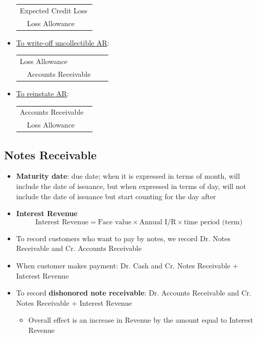 \documentclass{article}
\begin{document}
\begin{multicols}{2}
\begin{itemize}
	\begin{tabular}{llll}
		\multicolumn{4}{l}{Expected Credit Loss}\\
		& Loss Allowance& &
	\end{tabular}\vspace{0.5em}
    \item \underline{To write-off uncollectible AR}:\vspace{0.5em}\\
\begin{tabular}{llll}
	\multicolumn{4}{l}{Loss Allowance}\\
	& Accounts Receivable& &
\end{tabular}\vspace{0.5em}
    \item \underline{To reinstate AR}:\vspace{0.5em}\\
    \begin{tabular}{llll}
    	\multicolumn{4}{l}{Accounts Receivable}\\
    	& Loss Allowance& &
    \end{tabular}\vspace{0.5em}
\end{itemize}


\subsection{Notes Receivable}
\begin{itemize}
	\item \textbf{Maturity date}: due date; when it is expressed in terms of month, will include the date of issuance, but when expressed in terms of day, will not include the date of issuance but start counting for the day after
	\item \textbf{Interest Revenue}
	$$\text{Interest Revenue} = \text{Face value} \times \text{Annual I/R} \times \text{time period (term)}$$
	\item To record customers who want to pay by notes, we record Dr. Notes Receivable and Cr. Accounts Receivable
	\item When customer makes payment: Dr. Cash and Cr. Notes Receivable + Interest Revenue
	\item To record \textbf{dishonored note receivable}: Dr. Accounts Receivable and Cr. Notes Receivable + Interest Revenue
	\begin{itemize}
		\item Overall effect is an increase in Revenue by the amount equal to Interest Revenue
	\end{itemize}
\end{itemize}

\end{multicols}
\end{document}
